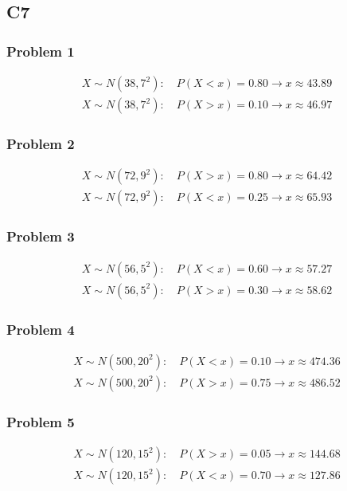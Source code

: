 \subsection{C7}

\subsubsection{Problem 1}
\[
\begin{array}{l}
	X\sim N(38,7^2):\quad P(X<x)=0.80 \longrightarrow x\approx 43.89\\
	X\sim N(38,7^2):\quad P(X>x)=0.10 \longrightarrow x\approx 46.97
\end{array}
\]

\subsubsection{Problem 2}
\[
\begin{array}{l}
	X\sim N(72,9^2):\quad P(X>x)=0.80 \longrightarrow x\approx 64.42\\
	X\sim N(72,9^2):\quad P(X<x)=0.25 \longrightarrow x\approx 65.93
\end{array}
\]

\subsubsection{Problem 3}
\[
\begin{array}{l}
	X\sim N(56,5^2):\quad P(X<x)=0.60 \longrightarrow x\approx 57.27\\
	X\sim N(56,5^2):\quad P(X>x)=0.30 \longrightarrow x\approx 58.62
\end{array}
\]

\subsubsection{Problem 4}
\[
\begin{array}{l}
	X\sim N(500,20^2):\quad P(X<x)=0.10 \longrightarrow x\approx 474.36\\
	X\sim N(500,20^2):\quad P(X>x)=0.75 \longrightarrow x\approx 486.52
\end{array}
\]

\subsubsection{Problem 5}
\[
\begin{array}{l}
	X\sim N(120,15^2):\quad P(X>x)=0.05 \longrightarrow x\approx 144.68\\
	X\sim N(120,15^2):\quad P(X<x)=0.70 \longrightarrow x\approx 127.86
\end{array}
\]

